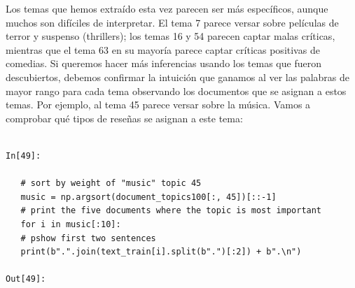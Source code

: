 Los temas que hemos extraído esta vez parecen ser más específicos, aunque muchos son difíciles de interpretar. El tema 7 parece versar sobre películas de terror y suspenso (thrillers); los temas 16 y 54 parecen captar malas críticas, mientras que el tema 63 en su mayoría parece captar críticas positivas de comedias. Si queremos hacer más inferencias usando los temas que fueron descubiertos, debemos confirmar la intuición que ganamos al ver las palabras de mayor rango  para cada tema observando los documentos que se asignan a estos temas. Por ejemplo, al tema 45 parece versar sobre la música. Vamos a comprobar qué tipos de reseñas se asignan a este tema:


\begin{lstlisting}

In[49]:
   
   # sort by weight of "music" topic 45
   music = np.argsort(document_topics100[:, 45])[::-1]
   # print the five documents where the topic is most important
   for i in music[:10]:
   # pshow first two sentences
   print(b".".join(text_train[i].split(b".")[:2]) + b".\n")

Out[49]:


\end{lstlisting}
